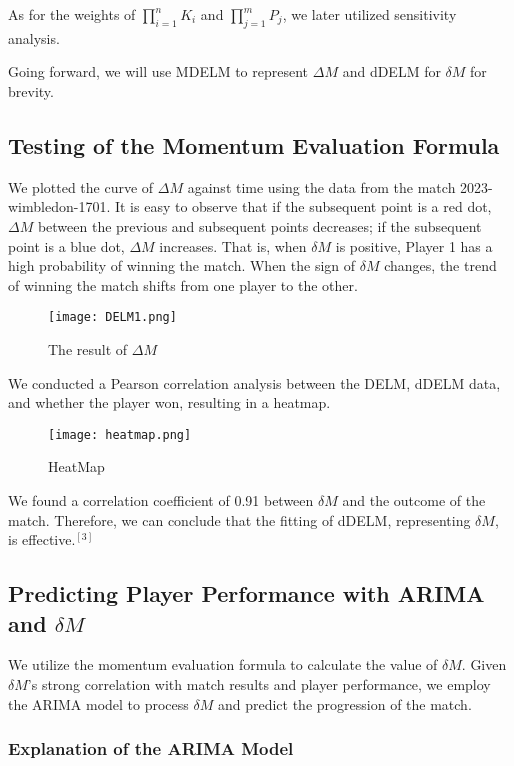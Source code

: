 \documentclass[12pt]{article}
\begin{document}
As for the weights of $\prod\limits_{i=1}^n K_i$ and $\prod\limits_{j=1}^m P_j$, we later utilized sensitivity analysis.

Going forward, we will use MDELM to represent $\Delta M$ and dDELM for $\delta M$ for brevity.

\subsection{Testing of the Momentum Evaluation Formula}

We plotted the curve of $\Delta M$ against time using the data from the match 2023-wimbledon-1701. It is easy to observe that if the subsequent point is a red dot, $\Delta M$ between the previous and subsequent points decreases; if the subsequent point is a blue dot, $\Delta M$ increases. That is, when $\delta M$ is positive, Player 1 has a high probability of winning the match. When the sign of $\delta M$ changes, the trend of winning the match shifts from one player to the other.

\begin{figure}[H]
\centering
\texttt{[image: DELM1.png]}
\caption{The result of $\Delta M$}\label{fig:DELM1}
\end{figure}

We conducted a Pearson correlation analysis between the DELM, dDELM data, and whether the player won, resulting in a heatmap.

\begin{figure}[H]
\centering
\texttt{[image: heatmap.png]}
\caption{HeatMap}\label{fig:heatmap}
\end{figure}

We found a correlation coefficient of 0.91 between $\delta M$ and the outcome of the match. Therefore, we can conclude that the fitting of dDELM, representing $\delta M$, is effective.$^{[3]} $

\subsection{Predicting Player Performance with ARIMA and $\delta M$}

We utilize the momentum evaluation formula to calculate the value of $\delta M$. Given $\delta M$'s strong correlation with match results and player performance, we employ the ARIMA model to process $\delta M$ and predict the progression of the match.

\subsubsection{Explanation of the ARIMA Model}
\end{document}
